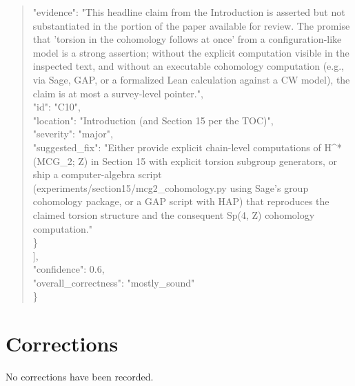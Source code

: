 \documentclass[11pt]{article}
\begin{document}
\begin{quote}
      "evidence": "This headline claim from the Introduction is asserted but not substantiated in the portion of the paper available for review. The promise that 'torsion in the cohomology follows at once' from a configuration-like model is a strong assertion; without the explicit computation visible in the inspected text, and without an executable cohomology computation (e.g., via Sage, GAP, or a formalized Lean calculation against a CW model), the claim is at most a survey-level pointer.",\\
      "id": "C10",\\
      "location": "Introduction (and Section 15 per the TOC)",\\
      "severity": "major",\\
      "suggested\_fix": "Either provide explicit chain-level computations of H\^{}*(MCG\_2; Z) in Section 15 with explicit torsion subgroup generators, or ship a computer-algebra script (experiments/section15/mcg2\_cohomology.py using Sage's group cohomology package, or a GAP script with HAP) that reproduces the claimed torsion structure and the consequent Sp(4, Z) cohomology computation."\\
    \}\\
  ],\\
  "confidence": 0.6,\\
  "overall\_correctness": "mostly\_sound"\\
\}\\
\end{quote}

\section*{Corrections}
No corrections have been recorded.
\end{document}
